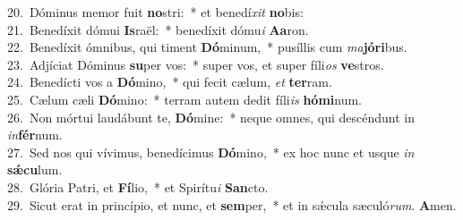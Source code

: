 {20.~}Dóminus memor fuit \textbf{no}stri:~* et benedí\textit{xit} \textbf{no}bis:\\
{21.~}Benedíxit dómui \textbf{Is}raël:~* benedíxit dómu\textit{i} \textbf{A}\textbf{a}ron.\\
{22.~}Benedíxit ómnibus, qui timent \textbf{Dó}minum,~* pusíllis cum \textit{ma}\textbf{jó}\textbf{ri}bus.\\
{23.~}Adjíciat Dóminus \textbf{su}per vos:~* super vos, et super fíli\textit{os} \textbf{ve}stros.\\
{24.~}Benedícti vos a \textbf{Dó}mino,~* qui fecit cælum, \textit{et} \textbf{ter}ram.\\
{25.~}Cælum cæli \textbf{Dó}mino:~* terram autem dedit fíli\textit{is} \textbf{hó}\textbf{mi}num.\\
{26.~}Non mórtui laudábunt te, \textbf{Dó}mine:~* neque omnes, qui descéndunt in \textit{in}\textbf{fér}num.\\
{27.~}Sed nos qui vívimus, benedícimus \textbf{Dó}mino,~* ex hoc nunc et usque \textit{in} \textbf{sǽ}\textbf{cu}lum.\\
{28.~}Glória Patri, et \textbf{Fí}lio,~* et Spirítu\textit{i} \textbf{San}cto.\\
{29.~}Sicut erat in princípio, et nunc, et \textbf{sem}per,~* et in sǽcula sæculó\textit{rum}. \textbf{A}men.\\
